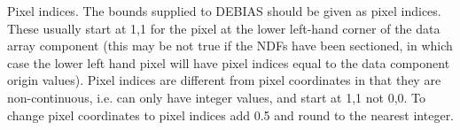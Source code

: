 {{{         \sstitem
         Pixel indices. The bounds supplied to DEBIAS should be given as
           pixel indices. These usually start at 1,1 for the pixel at the
           lower left-hand corner of the data array component (this may
           be not true if the NDFs have been sectioned, in which case the
           lower left hand pixel will have pixel indices equal to the data
           component origin values). Pixel indices are different from
           pixel coordinates in that they are non-continuous, i.e. can
           only have integer values, and start at 1,1 not 0,0. To change
           pixel coordinates to pixel indices add 0.5 and round to the
           nearest integer.
      }
   }
}

